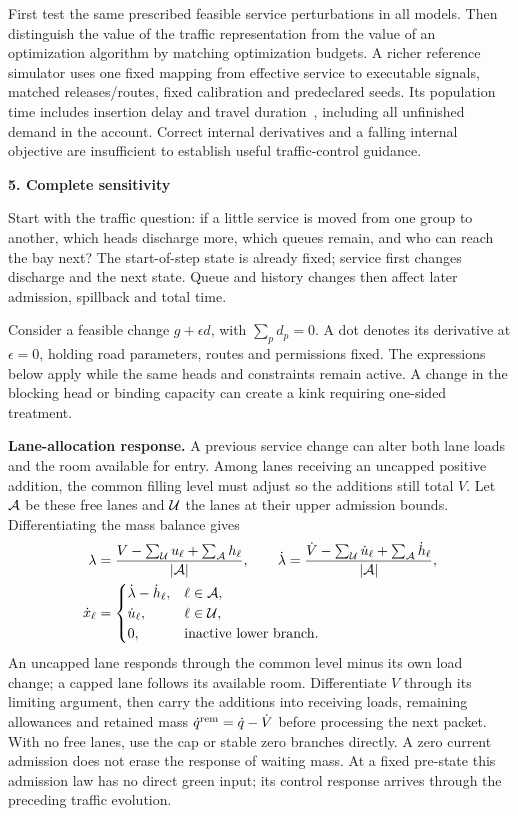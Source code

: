 \documentclass[10pt,a4paper]{article}
\newcommand{\head}[1]{\par\vspace{4pt}\noindent\textbf{#1}\par\nobreak\vspace{1pt}}
\begin{document}
First test the same prescribed feasible service perturbations in all
models. Then distinguish the value of the traffic representation from
the value of an optimization algorithm by matching optimization budgets.
A richer reference simulator uses one fixed mapping from effective
service to executable signals, matched releases/routes, fixed calibration
and predeclared seeds. Its population time includes insertion delay and
travel duration~\cite{sumo}, including all unfinished demand in the account.
Correct internal derivatives and a falling internal objective are
insufficient to establish useful traffic-control guidance.

\head{5. Complete sensitivity}
Start with the traffic question: if a little service is moved from one
group to another, which heads discharge more, which queues remain, and
who can reach the bay next? The start-of-step state is already fixed;
service first changes discharge and the next state. Queue and history
changes then affect later admission, spillback and total time.

Consider a feasible change $g+\epsilon d$, with $\sum_p d_p=0$.
A dot denotes its derivative at $\epsilon=0$, holding road parameters,
routes and permissions fixed. The expressions below apply while the
same heads and constraints remain active. A change in the blocking head
or binding capacity can create a kink requiring one-sided treatment.

\textbf{Lane-allocation response.} A previous service change can alter
both lane loads and the room available for entry. Among lanes receiving
an uncapped positive addition, the common filling level must adjust so
the additions still total $V$. Let ${\cal A}$ be these free lanes and
${\cal U}$ the lanes at their upper admission bounds. Differentiating
the mass balance gives
\begin{align}
 \lambda&=\frac{V-\sum_{\cal U}u_\ell+\sum_{\cal A}h_\ell}
                  {|{\cal A}|},\qquad
 \dot\lambda=\frac{\dot V-\sum_{\cal U}\dot u_\ell+
                                  \sum_{\cal A}\dot h_\ell}
                  {|{\cal A}|},\nonumber\\
 \dot x_\ell&=
 \begin{cases}
 \dot\lambda-\dot h_\ell,&\ell\in{\cal A},\\
 \dot u_\ell,&\ell\in{\cal U},\\
 0,&\text{inactive lower branch}.
 \end{cases}
 \label{eq:compact-allocation-derivative}
\end{align}
An uncapped lane responds through the common level minus its own load
change; a capped lane follows its available room. Differentiate $V$
through its limiting argument, then carry the additions into receiving
loads, remaining allowances and retained mass
$\dot q^{\rm rem}=\dot q-\dot V$ before processing the next packet.
With no free lanes, use the cap or stable zero branches directly.
A zero current admission does not erase the response of waiting mass.
At a fixed pre-state this admission law has no direct green input;
its control response arrives through the preceding traffic evolution.
\end{document}
